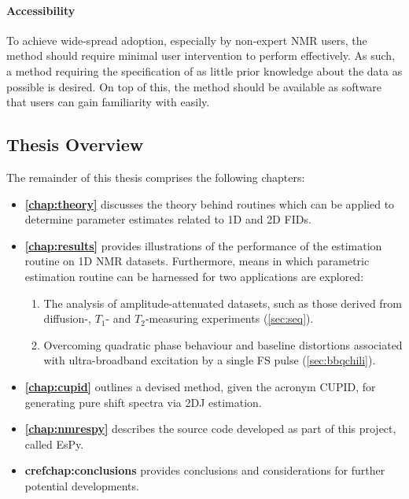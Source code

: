 \paragraph{Accessibility}
To achieve wide-spread adoption, especially by non-expert \ac{NMR} users,
the method should require minimal user intervention to perform effectively. As
such, a method requiring the specification of as little prior knowledge
about the data as possible is desired.
On top of this, the method should be available as software that users can gain
familiarity with easily.

\subsection{Thesis Overview}
The remainder of this thesis comprises the following chapters:
\begin{itemize}[label={},leftmargin=*]
    \item \textbf{\cref{chap:theory}} discusses the theory behind routines
        which can be applied to determine parameter estimates related to
        \ac{1D} and \ac{2D} \acp{FID}.
    \item \textbf{\cref{chap:results}} provides illustrations of the
        performance of the estimation routine on \ac{1D} \ac{NMR} datasets.
        Furthermore, means in which parametric estimation routine can be
        harnessed for two applications are explored:
        \begin{enumerate}
            \item The analysis of amplitude-attenuated datasets, such as those
                derived from diffusion-, $T_1$- and $T_2$-measuring
                experiments (\cref{sec:seq}).
            \item Overcoming quadratic phase behaviour and baseline distortions
                associated with ultra-broadband excitation by a single
                \acl{FS} pulse (\cref{sec:bbqchili}).
        \end{enumerate}
    \item \textbf{\cref{chap:cupid}} outlines a devised method, given the acronym
        \acs{CUPID}, for generating pure shift spectra via \ac{2DJ} estimation.
    \item \textbf{\cref{chap:nmrespy}} describes the source code developed as
        part of this project, called \ac{EsPy}.
    \item \textbf{cref{chap:conclusions}} provides conclusions and
        considerations for further potential developments.
\end{itemize}

